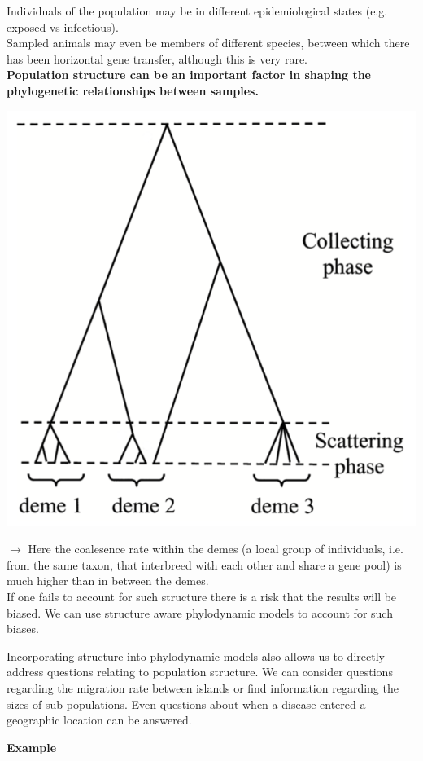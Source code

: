 \documentclass{article}
\begin{document}
\begin{multicols*}{3}
Individuals of the population may be in different epidemiological states (e.g. exposed vs infectious). \\

Sampled animals may even be members of different species, between which there has been horizontal gene transfer, although this is very rare.\\

\textbf{Population structure can be an important factor in shaping the phylogenetic relationships between samples.}

\begin{center}
    \includegraphics[width=0.7\linewidth, angle=0.0]{demephylo.png}
\end{center}

$\rightarrow$ Here the coalesence rate within the demes (a local group of individuals, i.e. from the same taxon, that interbreed with each other and share a gene pool) is much higher than in between the demes.\\

If one fails to account for such structure there is a risk that the results will be biased. We can use structure aware phylodynamic models to account for such biases. 

Incorporating structure into phylodynamic models also allows us to directly address questions relating to population structure. We can consider questions regarding the migration rate between islands or find information regarding the sizes of sub-populations. Even questions about when a disease entered a geographic location can be answered. 

\textbf{Example}


\end{multicols*}
\end{document}
